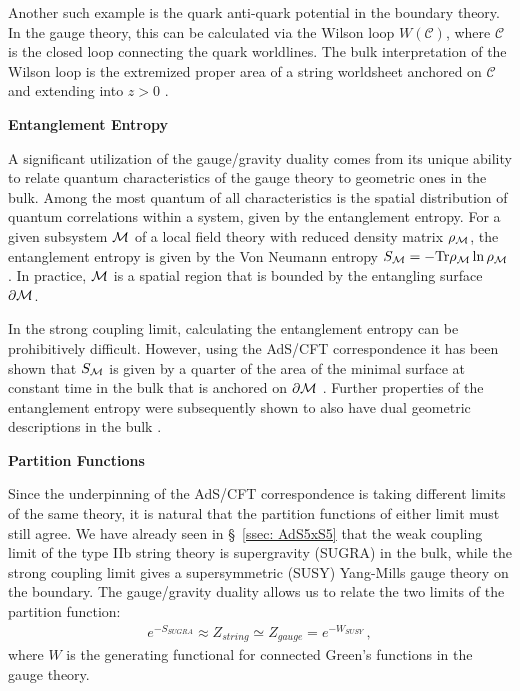 \documentclass[../PhD.tex]{subfiles}
\begin{document}
Another such example is the quark anti-quark potential in the boundary theory. In the gauge theory, this can be calculated via the Wilson loop $W(\mathcal C)$, where $\mathcal C$ is the closed loop connecting the quark worldlines. The bulk interpretation of the Wilson loop is the extremized proper area of a string worldsheet anchored on $\mathcal C$ and extending into $z > 0$ \cite{hep-th/9803002}. 

{\bf Entanglement Entropy}

A significant utilization of the gauge/gravity duality comes from its unique ability to relate quantum characteristics of the gauge theory to geometric ones in the bulk. Among the most quantum of all characteristics is the spatial distribution of quantum correlations within a system, given by the entanglement entropy. For a given subsystem $\mathcal M$ of a local field theory with reduced density matrix $\rho_{\mathcal M}$, the entanglement entropy is given by the Von Neumann entropy $S_{\mathcal M} = - \text{Tr} \rho_{\mathcal M} \ln \rho_{\mathcal M}$. In practice, $\mathcal M$ is a spatial region that is bounded by the entangling surface $\partial \mathcal M$.

In the strong coupling limit, calculating the entanglement entropy can be prohibitively difficult. However, using the AdS/CFT correspondence it has been shown that $S_{\mathcal M}$ is given by a quarter of the area of the minimal surface at constant time in the bulk that is anchored on $\partial \mathcal M$ \cite{hep-th/0603001}. Further properties of the entanglement entropy were subsequently shown to also have dual geometric descriptions in the bulk \cite{1304.4926}.

{\bf Partition Functions}

Since the underpinning of the AdS/CFT correspondence is taking different limits of the same theory, it is natural that the partition functions of either limit must still agree. We have already seen in \S~\!\ref{ssec: AdS5xS5} that the weak coupling limit of the type IIb string theory is supergravity (SUGRA) in the bulk, while the strong coupling limit gives a supersymmetric (SUSY) Yang-Mills gauge theory on the boundary. The gauge/gravity duality allows us to relate the two limits of the partition function:
\begin{align}
\label{partition functions}
e^{-S_{SUGRA}} \approx Z_{string} \simeq Z_{gauge} = e^{-W_{SUSY}} \, ,
\end{align}
where $W$ is the generating functional for connected Green's functions in the gauge theory.
\end{document}
